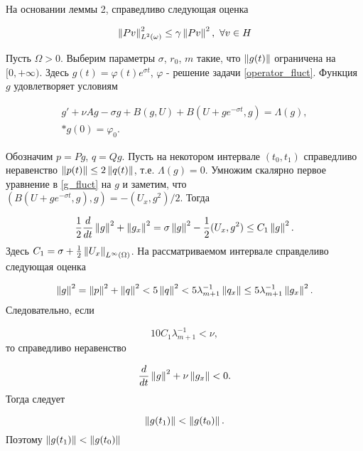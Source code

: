 На основании леммы 2, справедливо следующая оценка

\begin{equation}\label{lemma2_mark}
    \left\lVert Pv\right\rVert^2_{L^2(\omega)} \le \gamma \left\lVert Pv\right\rVert^2, \ \forall v \in H
\end{equation}

Пусть $\Omega > 0$. Выберим параметры $\sigma$, $r_0$, $m$ такие, что
$\left\lVert g(t)\right\rVert$ ограничена на $[0, +\infty)$. Здесь $g(t) = \varphi(t)e^{\sigma t}$, 
$\varphi$ - решение задачи \eqref{operator_fluct}. Функция $g$ удовлетворяет 
условиям

\begin{gather}\label{g_fluct}
    g' + \nu Ag - \sigma g + B(g, U) + B(U + ge^{-\sigma t}, g) = \Lambda(g),\\*
    g(0) = \varphi_0.
\end{gather}

Обозначим $p = Pg$, $q = Qg$. Пусть на некотором интервале $(t_0, t_1)$
справедливо неравенство $\left\lVert p(t)\right\rVert \le 2 \left\lVert q(t)\right\rVert$, т.е. $\Lambda(g) = 0$.
Умножим скалярно первое уравнение в \eqref{g_fluct} на $g$ и заметим, что $(B(U
+ g e^{-\sigma t}, g), g) = -(U_x, g^2) / 2$. Тогда

\begin{gather*}
    \frac{1}{2}\frac{d}{dt}\left\lVert g\right\rVert^2 + \left\lVert g_x\right\rVert^2 = \sigma \left\lVert g\right\rVert^2 -
    \frac{1}{2}(U_x, g^2) \le C_1\left\lVert g\right\rVert^2.
\end{gather*}
Здесь $C_1 = \sigma + \frac{1}{2}\left\lVert U_{x}\right\rVert_{L^{\infty}(\Omega)}$. На 
рассматриваемом интервале справделиво следующая оценка

\begin{gather*}
    \left\lVert g\right\rVert^2 = \left\lVert p\right\rVert^2 + \left\lVert q\right\rVert^2 < 5\left\lVert q\right\rVert^2 < 5\lambda^{-1}_{m +
    1}\left\lVert q_x\right\rVert \le 5 \lambda^{-1}_{m + 1}\left\lVert g_x\right\rVert^2.
\end{gather*}
Следовательно, если 

\begin{equation}
    10C_1 \lambda_{m + 1}^{-1} < \nu,
\end{equation}
то справедливо неравенство

\begin{equation}
    \frac{d}{dt}\left\lVert g\right\rVert^2 + \nu \left\lVert g_x\right\rVert < 0.
\end{equation}
Тогда следует

\begin{equation}\label{8}
    \left\lVert g(t_1)\right\rVert < \left\lVert g(t_0)\right\rVert.
\end{equation}
Поэтому $\left\lVert g(t_1)\right\rVert < \left\lVert g(t_0)\right\rVert$\\

